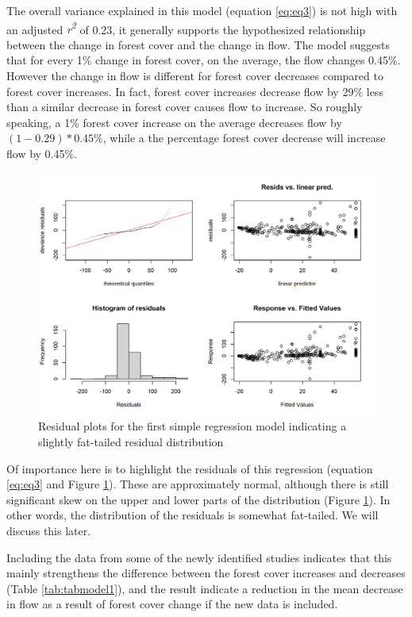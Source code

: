 \documentclass[]{elsarticle} %
\begin{document}
The overall variance explained in this model (equation \eqref{eq:eq3}) is not high with an adjusted \emph{r\textsuperscript{2}} of 0.23, it generally supports the hypothesized relationship between the change in forest cover and the change in flow. The model suggests that for every 1\% change in forest cover, on the average, the flow changes 0.45\%. However the change in flow is different for forest cover decreases compared to forest cover increases. In fact, forest cover increases decrease flow by 29\% less than a similar decrease in forest cover causes flow to increase. So roughly speaking, a 1\% forest cover increase on the average decreases flow by \((1 - 0.29)*0.45\%\), while a the percentage forest cover decrease will increase flow by 0.45\%.

\begin{figure}
\includegraphics[width=0.9\linewidth]{residual_plot_model1} \caption{Residual plots for the first simple regression model indicating a slightly fat-tailed residual distribution}\label{fig:gamcheck}
\end{figure}

Of importance here is to highlight the residuals of this regression (equation \eqref{eq:eq3} and Figure \ref{fig:gamcheck}). These are approximately normal, although there is still significant skew on the upper and lower parts of the distribution (Figure \ref{fig:gamcheck}). In other words, the distribution of the residuals is somewhat fat-tailed. We will discuss this later.

Including the data from some of the newly identified studies indicates that this mainly strengthens the difference between the forest cover increases and decreases (Table \ref{tab:tabmodel1}), and the result indicate a reduction in the mean decrease in flow as a result of forest cover change if the new data is included.
\end{document}
